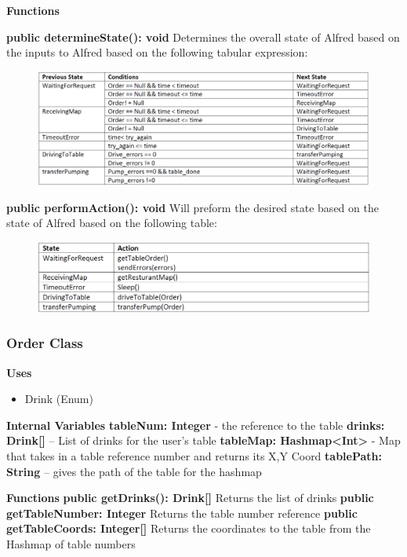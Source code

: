 \documentclass [10pt]{article}
\begin{document}
\textbf{Functions}

\textbf{public determineState(): void}
Determines the overall state of Alfred based on the inputs to Alfred based on the following tabular expression:
\begin{figure} [h!]
	\centering
	\includegraphics [scale = 0.4] {figures/AlfredSystem_DetermineState.png}
\end{figure}


\textbf{public performAction(): void}
Will preform the desired state based on the state of Alfred based on the following table:
\begin{figure} [h!]
	\centering
	\includegraphics [scale = 0.4] {figures/AlfredSystem_PerformAction.png}
\end{figure}
\subsubsection{Order Class}
\textbf{Uses}
\begin{itemize}
	\item Drink (Enum)
\end{itemize}


\textbf{Internal Variables}
\textbf{tableNum: Integer} - the reference to the table
\textbf{drinks: Drink[]} – List of drinks for the user’s table
\textbf{tableMap: Hashmap<Int>} -  Map that takes in a table reference number and returns its X,Y Coord
\textbf{tablePath: String} – gives the path of the table for the hashmap 

\textbf{Functions}
\textbf{public getDrinks(): Drink[]}
Returns the list of drinks
\textbf{public getTableNumber: Integer}
Returns the table number reference
\textbf{public getTableCoords: Integer[]}
Returns the coordinates to the table from the Hashmap of table numbers
\end{document}
